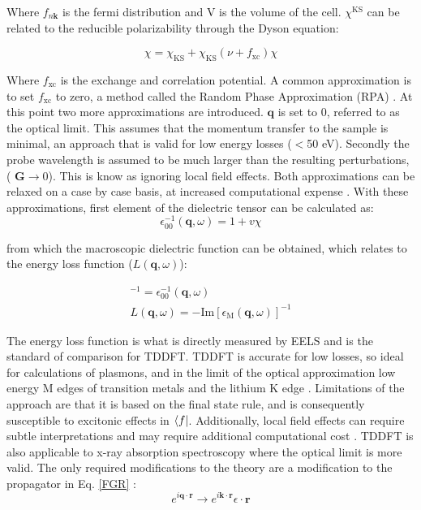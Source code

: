 Where $f_{n\textbf{k}}$ is the fermi distribution and V is the volume of the cell.  $\chi^{\mathrm{KS}}$ can be related to the reducible polarizability through the Dyson equation:  

\begin{equation}
\chi = \chi_{\mathrm{KS}} + \chi_{\mathrm{KS}}(\nu + f_{\mathrm{xc}})\chi
\end{equation}

Where $f_{\mathrm{xc}}$ is the exchange and correlation potential.  A common approximation is to set $f_{\mathrm{xc}}$ to zero, a method called the Random Phase Approximation (RPA) \cite{optic}.  At this point two more approximations are introduced.  $\textbf{q}$  is set to 0, referred to as the optical limit.  This assumes that the momentum transfer to the sample is minimal, an approach that is valid for low energy losses ($<$50 eV).  Secondly the probe wavelength is assumed to be much larger than the resulting perturbations, ($\textbf{ G} \to 0$). This is know as ignoring local field effects.  Both approximations can be relaxed on a case by case basis, at increased computational expense \cite{exciting}. With these approximations, first element of the dielectric tensor can be calculated as: 
\begin{equation}
\epsilon_{\mathrm{00}}^{-1} (\textbf{q},\omega) =1+v \chi
\end{equation}

from which the macroscopic dielectric function can be obtained, which relates to the energy loss function ($L(\textbf{q},\omega)$): 

\begin{gather}
[\epsilon_{\mathrm{M}}(\textbf{q},\omega)]^{-1} = \epsilon_{\mathrm{00}}^{-1}(\textbf{q},\omega)\\
	L(\textbf{q},\omega) = -\mathrm{Im}[\epsilon_{\mathrm{M}}(\textbf{q},\omega)]^{-1}
\end{gather}

The energy loss function is what is directly measured by EELS and is the standard of comparison for TDDFT. TDDFT is accurate for low losses, so ideal for calculations of plasmons, and in the limit of the optical approximation low energy M edges of transition metals and the lithium K edge \cite{mauchamp_local_2008}.  Limitations of the approach are that it is based on the final state rule, and is consequently susceptible to excitonic effects in $\bra{f}$.  Additionally, local field effects can require subtle interpretations and  may require  additional  computational cost \cite{mauchamp_local_2008}.    TDDFT is also applicable to x-ray absorption spectroscopy where the optical limit is more valid.  The only required modifications to the theory are a modification to the propagator in Eq. \ref{FGR} \cite{ankudinov_real-space_1998}:
\begin{equation}
e^{i\textbf{q}\cdot\textbf{r}} \to e^{i\textbf{k}\cdot\textbf{r}}\epsilon \cdot \textbf{r}
\label{x-prop}
\end{equation}

